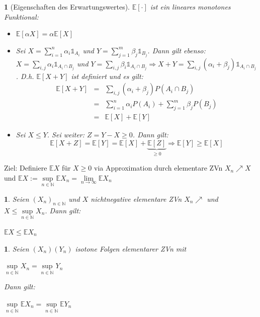 \documentclass[10pt,a4paper]{report}
\numberwithin{equation}{section}
\numberwithin{figure}{section}
\theoremstyle{plain}
\theoremstyle{definition}
\theoremstyle{remark}
\theoremstyle{plain}
\newtheorem{lem}[thm]{\protect\lemmaname}
\newtheorem{prop}[thm]{\protect\propositionname}
\newtheorem{cor}[thm]{\protect\corollaryname}
\providecommand{\corollaryname}{Korollar}
\providecommand{\lemmaname}{Lemma}
\providecommand{\propositionname}{Satz}
\newcommand{\1}{ \mathbb{1} } %
\begin{document}
\begin{prop}[Eigenschaften des Erwartungswertes] 
  $\mathbb{E}[\cdot]$ ist ein lineares monotones Funktional:
  \begin{itemize}
  \item $\mathbb{E}[\alpha X]=\alpha \mathbb{E}[X]$
  \item Sei $X=\sum\limits_{i=1}^n\alpha_i \1_{A_i}$ und
    $Y=\sum\limits_{j=1}^m\beta_j\1_{B_j}$. Dann gilt ebenso:
    $X=\sum\limits_{i,j}\alpha_i\1_{A_i\cap B_j}$ und
    $Y=\sum\limits_{i,j}\beta_i\1_{A_i\cap B_j} \Rightarrow
    X+Y=\sum\limits_{i,j}(\alpha_i+\beta_j)\1_{A_i\cap
      B_j}$. D.h. $\mathbb{E}[X+Y]$ ist definiert und es gilt:
    \begin{eqnarray*}
      \mathbb{E}[X+Y]&=& \sum\limits_{i,j}(\alpha_i+\beta_j)P(A_i\cap B_j)\\
      &=&\sum\limits_{i=1}^n\alpha_i P(A_i)+\sum\limits_{j=1}^m\beta_jP(B_j)\\
      &=&\mathbb{E}[X]+\mathbb{E}[Y]
    \end{eqnarray*} 
  \item Sei $X\leq Y$. Sei weiter: $Z=Y-X\geq 0$. Dann gilt:
    \[\mathbb{E}[X+Z]=\mathbb{E}[Y]=\mathbb{E}[X]+\underbrace{\mathbb{E}[Z]}_{\geq
      0} \Rightarrow \mathbb{E}[Y]\geq \mathbb{E}[X]\]
  \end{itemize}
\end{prop}
Ziel: Definiere $\mathbb{E}X$ für $X\geq 0$ via Approximation durch elementare ZVn $X_n\nearrow X$ und $\mathbb{E}X:=\sup\limits_{n\in \mathbb{N}}\mathbb{E}X_n=\lim\limits_{n\to \infty} \mathbb{E}X_n$
\begin{lem}\label{lem:erwartungswertabschaetzung} 
  Seien $(X_n)_{n\in \mathbb{N}}$ und $X$ nichtnegative elementare ZVn
  $X_n\nearrow$ und $X\leq \sup\limits_{n\in \mathbb{N}} X_n$. Dann
  gilt:
  \begin{center}
    $\mathbb{E}X\leq \mathbb{E}X_n$
  \end{center}
\end{lem}
\begin{cor}
  Seien $(X_n)(Y_n)$ isotone Folgen elementarer ZVn mit
  \begin{center}
    $\sup\limits_{n\in \mathbb{N}} X_n=\sup\limits_{n\in \mathbb{N}}
    Y_n$
  \end{center}
  Dann gilt:
  \begin{center}
    $\sup\limits_{n\in \mathbb{N}}\mathbb{E} X_n=\sup\limits_{n\in
      \mathbb{N}}\mathbb{E} Y_n$
  \end{center}
\end{cor}
\end{document}
